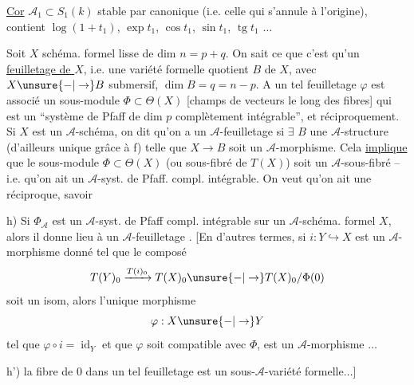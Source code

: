 \uline{Cor} $\mathcal A_1\subset S_1(k)$ stable par  canonique (i.e. celle qui s'annule à l'origine), contient $\log(1+t_1)$, $\exp t_1$, $\cos t_1$, $\sin t_1$, $\operatorname{tg}t_1$ $\ldots$

Soit $X$ schéma. formel lisse de dim $n=p+q$. On sait ce que c'est qu'un \uline{feuilletage de $X$}, i.e. une variété formelle quotient $B$ de $X$, avec $X\unsure{-|\to}B$ submersif, $\dim B=q=n-p$. A un tel feuilletage $\varphi$ est associé un sous-module $\Phi\subset\Theta(X)$ [champs de vecteurs le long des fibres] qui est un ``système de Pfaff de dim $p$ complètement intégrable'', et réciproquement. Si $X$ est un $\mathcal A$-schéma, on dit qu'on a un $\mathcal A$-feuilletage si $\exists$ $B$ une $\mathcal A$-structure (d'ailleurs unique\unsure{\}|)} grâce à f) telle que $X\longrightarrow B$ soit un $\mathcal A$-morphisme. Cela \uline{implique} que le sous-module $\Phi\subset\Theta(X)$ (ou sous-fibré de $T(X)$) soit un $\mathcal A$-sous-fibré -- i.e. qu'on ait un $\mathcal A$-syst. de Pfaff. compl. intégrable. On veut qu'on ait une réciproque, savoir

h) Si $\Phi_{\mathcal A}$ est un $\mathcal A$-syst. de Pfaff compl. intégrable sur un $\mathcal A$-schéma. formel $X$, alors il donne lieu à un $\mathcal A$-feuilletage .
[En d'autres termes, si $i:Y\hookrightarrow X$ est un $\mathcal A$-morphisme donné tel que le composé
\[
T(Y)_0\xrightarrow{T(i)_0}T(X)_0\unsure{-|\to}T(X)_0/\Phi(0)
\]
soit un isom, alors l'unique morphisme
\[
\varphi:X\unsure{-|\to}Y
\]
tel que $\varphi\circ i=\operatorname{id}_Y$ et que $\varphi$ soit compatible avec $\Phi$, est un $\mathcal A$-morphisme $\ldots$

h') la fibre de $0$ dans un tel feuilletage est un sous-$\mathcal A$-variété formelle$\ldots$]

